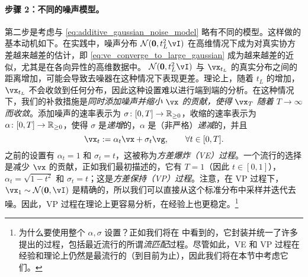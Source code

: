 \documentclass[../../book-main.tex]{subfiles}
\begin{document}
\paragraph{步骤 2：不同的噪声模型。} 第二步是考虑与 \eqref{eq:additive_gaussian_noise_model} 略有不同的模型。这样做的基本动机如下。在实践中，噪声分布 \(\dNorm(\vzero, t_{L}^{2}\vI)\) 在高维情况下成为对真实协方差越来越差的估计，即 \eqref{eq:ve_converge_to_large_gaussian} 成为越来越差的近似，尤其是在各向异性的高维数据中。 \(\dNorm(\vzero, t_{L}^{2}\vI)\) 与 \(\vx_{t_{L}}\) 的真实分布之间的距离增加，可能会导致去噪器在这种情况下表现更差。理论上，随着 \(t_{L}\) 的增加，\(\vx_{t_{L}}\) 不会收敛到任何分布，因此这种设置难以进行端到端的分析。在这种情况下，我们的补救措施是\textit{同时添加噪声并缩小 \(\vx\) 的贡献，使得 \(\vx_{T}\) 随着 \(T \to \infty\) 而收敛}。添加噪声的速率表示为 \(\sigma \colon [0, T] \to \mathbb{R}_{\geq 0}\)，收缩的速率表示为 \(\alpha \colon [0, T] \to \mathbb{R}_{\geq 0}\)，使得 \(\sigma\) 是\textit{递增}的，\(\alpha\) 是（非严格）\textit{递减}的，并且
\begin{equation}\label{eq:gen_additive_gaussian_noise_model}
	\vx_{t} := \alpha_{t}\vx + \sigma_{t}\vg, \qquad \forall t \in [0, T].
\end{equation}
之前的设置有 \(\alpha_{t} = 1\) 和 \(\sigma_{t} = t\)，这被称为\textit{方差爆炸（VE）过程}。一个流行的选择是减少 \(\vx\) 的贡献，正如我们最初描述的，它有 \(T = 1\)（因此 \(t \in [0, 1]\)），\(\alpha_{t} = \sqrt{1 - t^{2}}\) 和 \(\sigma_{t} = t\)；这是\textit{方差保持（VP）过程}。注意，在 VP 过程下，\(\vx_{1} \sim \dNorm(\vzero, \vI)\) 是精确的，所以我们可以直接从这个标准分布中采样并迭代去噪。因此，VP 过程在理论上更容易分析，在经验上也更稳定。\footnote{为什么要使用整个 \(\alpha, \sigma\) 设置？正如我们将在  中看到的，它封装并统一了许多提出的过程，包括最近流行的所谓\textit{流匹配}过程。尽管如此，VE 和 VP 过程在经验和理论上仍然是最流行的（到目前为止），因此我们将在本节中考虑它们。}
\end{document}
